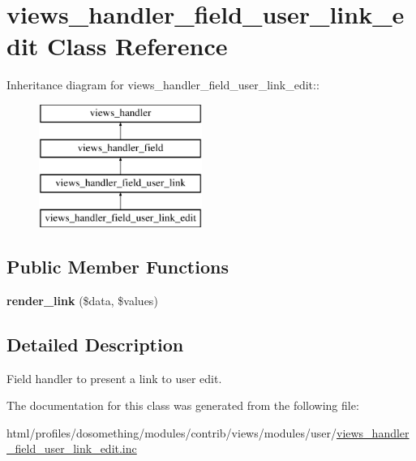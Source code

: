 \hypertarget{classviews__handler__field__user__link__edit}{
\section{views\_\-handler\_\-field\_\-user\_\-link\_\-edit Class Reference}
\label{classviews__handler__field__user__link__edit}
}
Inheritance diagram for views\_\-handler\_\-field\_\-user\_\-link\_\-edit::\begin{figure}[H]
\begin{center}
\leavevmode
\includegraphics[height=4cm]{classviews__handler__field__user__link__edit}
\end{center}
\end{figure}
\subsection*{Public Member Functions}
\begin{DoxyCompactItemize}
\item 
\hypertarget{classviews__handler__field__user__link__edit_acbbd497a84e89eec45ec0d144ebaa39f}{
{\bfseries render\_\-link} (\$data, \$values)}
\label{classviews__handler__field__user__link__edit_acbbd497a84e89eec45ec0d144ebaa39f}

\end{DoxyCompactItemize}


\subsection{Detailed Description}
Field handler to present a link to user edit. 

The documentation for this class was generated from the following file:\begin{DoxyCompactItemize}
\item 
html/profiles/dosomething/modules/contrib/views/modules/user/\hyperlink{views__handler__field__user__link__edit_8inc}{views\_\-handler\_\-field\_\-user\_\-link\_\-edit.inc}\end{DoxyCompactItemize}
